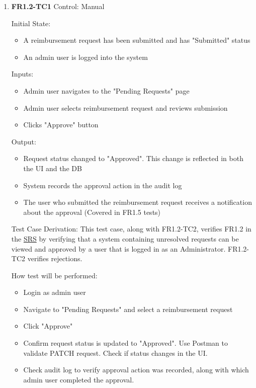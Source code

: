 \documentclass[12pt, titlepage]{article}
\begin{document}
\begin{enumerate}
    \item{\textbf{FR1.2-TC1}}
    \hypertarget{FR1.2-TC1}{}
    Control: Manual	
    
    Initial State:
    \begin{itemize}
        \item A reimbursement request has been submitted and has "Submitted" status
        \item An admin user is logged into the system
    \end{itemize}
    
    Inputs:					
    \begin{itemize}
        \item Admin user navigates to the "Pending Requests" page
        \item Admin user selects reimbursement request and reviews submission
        \item Clicks "Approve" button
    \end{itemize}
    
    Output: 
    \begin{itemize}
        \item Request status changed to "Approved". This change is reflected in both the UI and the DB
        \item System records the approval action in the audit log
        \item The user who submitted the reimbursement request receives a notification about the approval (Covered in FR1.5 tests)
    \end{itemize}
    
    Test Case Derivation: This test case, along with FR1.2-TC2, verifies FR1.2 in the \href{https://shorturl.at/FdAgR}{SRS} by verifying that a system containing unresolved requests can be viewed and approved by a user that is logged in as an Administrator. FR1.2-TC2 verifies rejections.
    
    How test will be performed:
    \begin{itemize}
        \item Login as admin user
        \item Navigate to "Pending Requests" and select a reimbursement request
        \item Click "Approve"
        \item Confirm request status is updated to "Approved". Use Postman to validate PATCH request. Check if status changes in the UI.
        \item Check audit log to verify approval action was recorded, along with which admin user completed the approval.
    \end{itemize}


\end{enumerate}
\end{document}
